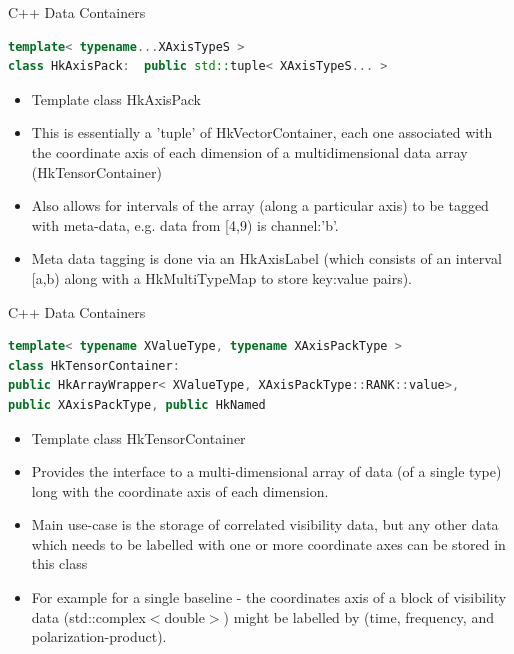 \documentclass[xcolor=svgnames]{beamer}
\begin{document}
\begin{frame}[fragile]{C++ Data Containers}

\begin{lstlisting}[language=C++,basicstyle=\ttfamily\tiny,keywordstyle=\color{red}]
template< typename...XAxisTypeS >
class HkAxisPack:  public std::tuple< XAxisTypeS... >
\end{lstlisting}

\begin{itemize}
\item Template class HkAxisPack
\item This is essentially a 'tuple' of HkVectorContainer, each one associated with the coordinate axis of each dimension of a multidimensional data array (HkTensorContainer)
\item Also allows for intervals of the array (along a particular axis) to be tagged with meta-data, e.g. data from [4,9) is channel:'b'.
\item Meta data tagging is done via an HkAxisLabel (which consists of an interval [a,b) along with a HkMultiTypeMap to store key:value pairs).
\end{itemize}

\end{frame}

\begin{frame}[fragile]{C++ Data Containers}

\begin{lstlisting}[language=C++,basicstyle=\ttfamily\tiny,keywordstyle=\color{red}]
template< typename XValueType, typename XAxisPackType >
class HkTensorContainer: 
public HkArrayWrapper< XValueType, XAxisPackType::RANK::value>, 
public XAxisPackType, public HkNamed
\end{lstlisting}

\begin{itemize}
\item Template class HkTensorContainer
\item Provides the interface to a multi-dimensional array of data (of a single type) long with the coordinate axis of each dimension.
\item Main use-case is the storage of correlated visibility data, but any other data which needs to be labelled with one or more coordinate axes can be stored in this class
\item For example for a single baseline - the coordinates axis of a block of visibility data (std::complex$<$double$>$) might be labelled by (time, frequency, and polarization-product).
\end{itemize}

\end{frame}
\end{document}
